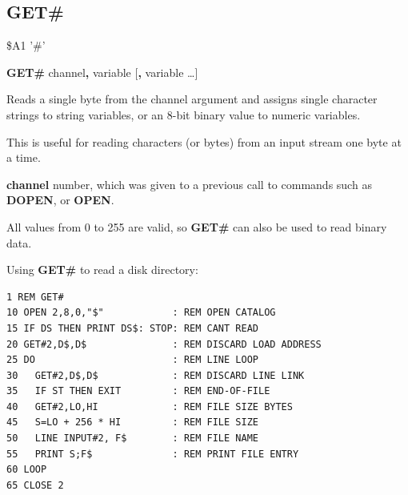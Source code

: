 \subsection{GET\#}
\begin{description}[leftmargin=2cm,style=nextline]
\item [Token:] \$A1 '\#'
\item [Format:] {\bf GET\#} channel{\bf,} variable [{\bf,} variable \dots]
\item [Usage:] Reads a single byte from the channel argument
               and assigns single character strings to
               string variables, or an 8-bit binary value
               to numeric variables.

               This is useful for reading characters (or bytes) from
               an input stream one byte at a time.

               {\bf channel} number, which was given to a previous
               call to commands such as {\bf DOPEN}, or {\bf OPEN}.

\item [Remarks:] All values from 0 to 255 are valid, so {\bf GET\#}
                 can also be used to read binary data.

\item [Example:] Using {\bf GET\#} to read a disk directory:
\begin{tcolorbox}[colback=black,coltext=white]
\verbatimfont{\codefont}
\begin{verbatim}
1 REM GET#
10 OPEN 2,8,0,"$"            : REM OPEN CATALOG
15 IF DS THEN PRINT DS$: STOP: REM CANT READ
20 GET#2,D$,D$               : REM DISCARD LOAD ADDRESS
25 DO                        : REM LINE LOOP
30   GET#2,D$,D$             : REM DISCARD LINE LINK
35   IF ST THEN EXIT         : REM END-OF-FILE
40   GET#2,LO,HI             : REM FILE SIZE BYTES
45   S=LO + 256 * HI         : REM FILE SIZE
50   LINE INPUT#2, F$        : REM FILE NAME
55   PRINT S;F$              : REM PRINT FILE ENTRY
60 LOOP
65 CLOSE 2
\end{verbatim}
\end{tcolorbox}
\end{description}


\newpage
